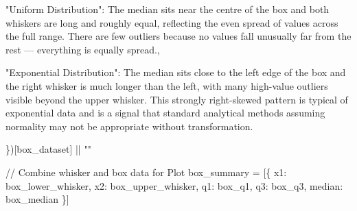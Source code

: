 \documentclass[
  letterpaper,
  DIV=11,
  numbers=noendperiod]{scrartcl}
\newenvironment{Shaded}{\begin{snugshade}}{\end{snugshade}}
\newcommand{\NormalTok}[1]{\textcolor[rgb]{0.00,0.23,0.31}{#1}}
\begin{document}
\begin{Shaded}
\begin{Highlighting}[]
\NormalTok{  "Uniform Distribution": \textasciigrave{}The median sits near the centre of the box and both }
\NormalTok{    whiskers are long and roughly equal, reflecting the even spread of values across }
\NormalTok{    the full range. There are few outliers because no values fall unusually far from }
\NormalTok{    the rest — everything is equally spread.\textasciigrave{},}

\NormalTok{  "Exponential Distribution": \textasciigrave{}The median sits close to the left edge of the box and }
\NormalTok{    the right whisker is much longer than the left, with many high{-}value outliers }
\NormalTok{    visible beyond the upper whisker. This strongly right{-}skewed pattern is typical }
\NormalTok{    of exponential data and is a signal that standard analytical methods assuming }
\NormalTok{    normality may not be appropriate without transformation.\textasciigrave{}}

\NormalTok{\})[box\_dataset] || ""}

\NormalTok{// Combine whisker and box data for Plot}
\NormalTok{box\_summary = [\{ }
\NormalTok{  x1: box\_lower\_whisker, }
\NormalTok{  x2: box\_upper\_whisker,}
\NormalTok{  q1: box\_q1,}
\NormalTok{  q3: box\_q3,}
\NormalTok{  median: box\_median}
\NormalTok{\}]}


\end{Highlighting}
\end{Shaded}
\end{document}
